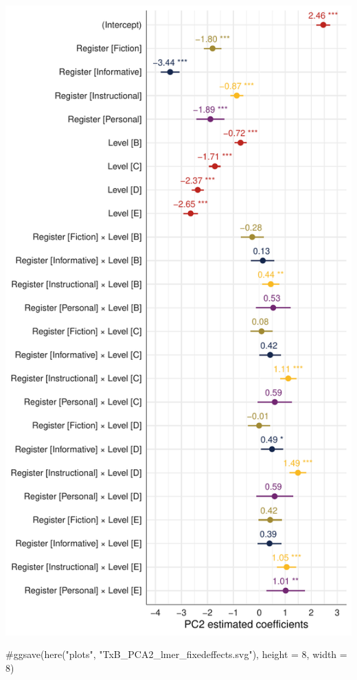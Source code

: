 \documentclass[
  letterpaper,
  DIV=11,
  numbers=noendperiod]{scrreprt}
\newenvironment{Shaded}{\begin{snugshade}}{\end{snugshade}}
\newcommand{\CommentTok}[1]{\textcolor[rgb]{0.37,0.37,0.37}{#1}}
\begin{document}
\includegraphics{E_Ch6_Analysis_files/figure-pdf/Dim2fixed-1.pdf}

\begin{Shaded}
\begin{Highlighting}[]
\CommentTok{\#ggsave(here("plots", "TxB\_PCA2\_lmer\_fixedeffects.svg"), height = 8, width = 8)}
\end{Highlighting}
\end{Shaded}
\end{document}
